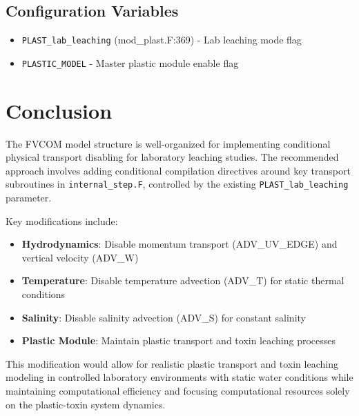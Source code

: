 \documentclass[12pt,a4paper]{article}
\begin{document}
\subsection{Configuration Variables}
\begin{itemize}
    \item \texttt{PLAST\_lab\_leaching} (mod\_plast.F:369) - Lab leaching mode flag
    \item \texttt{PLASTIC\_MODEL} - Master plastic module enable flag
\end{itemize}

\section{Conclusion}

The FVCOM model structure is well-organized for implementing conditional physical transport disabling for laboratory leaching studies. The recommended approach involves adding conditional compilation directives around key transport subroutines in \texttt{internal\_step.F}, controlled by the existing \texttt{PLAST\_lab\_leaching} parameter.

Key modifications include:
\begin{itemize}
    \item \textbf{Hydrodynamics}: Disable momentum transport (ADV\_UV\_EDGE) and vertical velocity (ADV\_W)
    \item \textbf{Temperature}: Disable temperature advection (ADV\_T) for static thermal conditions
    \item \textbf{Salinity}: Disable salinity advection (ADV\_S) for constant salinity
    \item \textbf{Plastic Module}: Maintain plastic transport and toxin leaching processes
\end{itemize}

This modification would allow for realistic plastic transport and toxin leaching modeling in controlled laboratory environments with static water conditions while maintaining computational efficiency and focusing computational resources solely on the plastic-toxin system dynamics.
\end{document}
